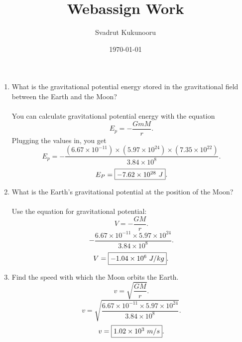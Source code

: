 \documentclass[a4paper]{article}
\title{Webassign Work}
\author{Svadrut Kukunooru}
\date{\today}
\begin{document}
    \maketitle
    \begin{enumerate}
        \item What is the gravitational potential energy stored in the gravitational field between the Earth and the Moon? \\ \\
        You can calculate gravitational potential energy with the equation
            \[
            E_p = -\frac{GmM}{r}
            .\] 
        Plugging the values in, you get
            \[
                E_p = -\frac{(6.67 \times 10^{-11}) \times (5.97 \times 10^{24}) \times \left( 7.35 \times 10^{22} \right)}{3.84 \times 10^8}
            .\]
            \[
                E_P = \fbox{$-7.62 \times 10^{28}\ J$}
            .\] 
        \item What is the Earth's gravitational potential at the position of the Moon? \\ \\ 
            Use the equation for gravitational potential:
            \[
            V = -\frac{GM}{r}
            .\] 
            \[
                -\frac{6.67 \times 10^{-11} \times 5.97 \times 10^{24}}{3.84 \times 10^8}
            .\] 
            \[
                V = \fbox{$-1.04 \times 10^6\ J / kg$}
            .\]
            \item Find the speed with which the Moon orbits the Earth. 
            \[
            v = \sqrt{\frac{GM}{r}} 
            .\] 
            \[
                v = \sqrt{\frac{6.67 \times 10^{-11} \times 5.97 \times 10^{24}}{3.84 \times 10^8}} 
            .\] 
            \[
                v = \fbox{$1.02 \times 10^3\ m / s$}
            .\] 
    \end{enumerate}
\end{document}
